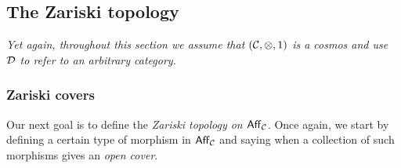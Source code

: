 
\subsection{The Zariski topology} %
\label{sub:the_zariski_topology}

    \emph{Yet again, throughout this section we assume that $(\mathcal{C},\otimes,1)$ is a cosmos and use $\mathcal{D}$ to refer to an arbitrary category.}

    \subsubsection{Zariski covers} %
    \label{ssub:zariski_covers}

        Our next goal is to define the \emph{Zariski topology on $\mathsf{Aff}_{\mathcal{C}}$}.
        Once again, we start by defining a certain type of morphism in $\mathsf{Aff}_{\mathcal{C}}$ and saying when a collection of such morphisms gives an \emph{open cover}.

